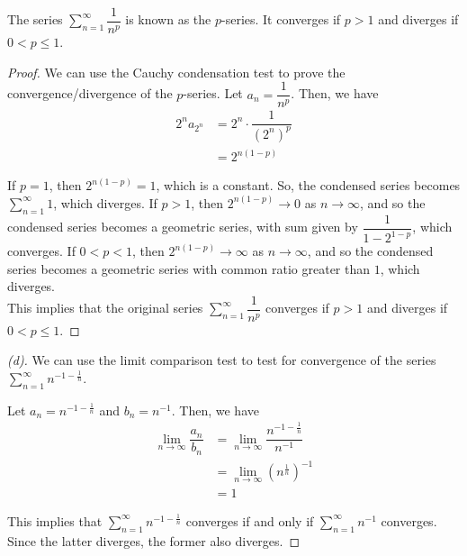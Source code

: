 \documentclass{article}
\begin{document}
\begin{remark*}[$p$-series]
    The series $\displaystyle\sum_{n=1}^{\infty} \dfrac{1}{n^p}$ is known as the $p$-series. It converges if $p > 1$ and diverges if $0 < p \leq 1$.

    \begin{proof}
        We can use the Cauchy condensation test to prove the convergence/divergence of the $p$-series. Let $a_n = \dfrac{1}{n^p}$. Then, we have
        \begin{align*}
            2^n a_{2^n} 
            &= 2^n \cdot \dfrac{1}{(2^n)^p} \\
            &= 2^{n(1-p)}
        \end{align*}

        If $p = 1$, then $2^{n(1-p)} = 1$, which is a constant. So, the condensed series becomes $\displaystyle\sum_{n=1}^{\infty} 1$, which diverges. If $p > 1$, then $2^{n(1-p)} \to 0$ as $n \to \infty$, and so the condensed series becomes a geometric series, with sum given by $\dfrac{1}{1 - 2^{1-p}}$, which converges. If $0 < p < 1$, then $2^{n(1-p)} \to \infty$ as $n \to \infty$, and so the condensed series becomes a geometric series with common ratio greater than $1$, which diverges. \\

        This implies that the original series $\displaystyle\sum_{n=1}^{\infty} \dfrac{1}{n^p}$ converges if $p > 1$ and diverges if $0 < p \leq 1$.
    \end{proof}

\end{remark*}

\begin{proof}[(d)]
    We can use the limit comparison test to test for convergence of the series $\displaystyle\sum_{n=1}^{\infty} n^{-1 - \frac{1}{n}}$.

    Let $a_n = n^{-1 - \frac{1}{n}}$ and $b_n = n^{-1}$. Then, we have
    \begin{align*}
        \lim\limits_{n \to \infty} \dfrac{a_n}{b_n} 
        &= \lim\limits_{n \to \infty} \dfrac{n^{-1 - \frac{1}{n}}}{n^{-1}} \\
        &= \lim\limits_{n \to \infty} \left( n^{\frac{1}{n}} \right)^{-1} \\
        &= 1
    \end{align*}

    This implies that $\displaystyle\sum_{n=1}^{\infty} n^{-1 - \frac{1}{n}}$ converges if and only if $\displaystyle\sum_{n=1}^{\infty} n^{-1}$ converges. Since the latter diverges, the former also diverges.
\end{proof}
\end{document}
